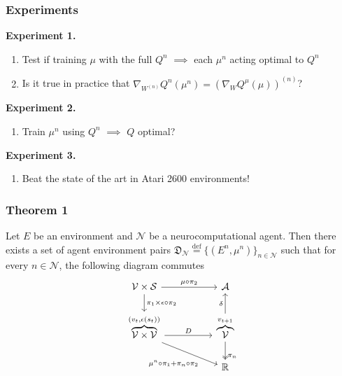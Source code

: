 \documentclass{beamer}
\numberwithin{equation}{subsection}
\numberwithin{theorem}{subsection}
\def\reals{{\mathbb R}}
\def\defeq{\stackrel{\text{def}}{=}}
\def\scriptv{{\mathcal V}}
\def\scripta{{\mathcal A}}
\def\scriptn{{\mathcal N}}
\def\scripts{{\mathcal S}}
\begin{document}
\begin{frame}
  \frametitle{Experiments}
  \textbf{Experiment 1.}
  \begin{enumerate}
    \item Test if training $\mu$ with the full $Q^n$ $\implies$ each $\mu^n$ acting optimal to $Q^n$
    \item Is it true in practice that $\nabla_{W^{(n)}} Q^{n}(\mu^n) = \left(\nabla_{W} Q^\mu(\mu)\right)^{(n)}$?
  \end{enumerate}
    \textbf{Experiment 2.}
    \begin{enumerate}
      \item Train $\mu^n$ using $Q^n$ $\implies$ $Q$ optimal?
    \end{enumerate}
        \textbf{Experiment 3.}
    \begin{enumerate}
      \item Beat the state of the art in Atari 2600 environments!
    \end{enumerate}
\end{frame}
\begin{frame}
    \frametitle{Theorem 1}
    \begin{theorem}\label{thm:ncomp}
      Let $E$ be an environment and $\scriptn$ be a neurocomputational agent. Then there exists a set of agent environment pairs $\mathfrak{D}_\scriptn \defeq \{(E^n, \mu^n)\}_{n\in \scriptn}$ such that for every $n \in \scriptn$, the following diagram commutes
        \begin{equation}\label{eq:sub_env_com}
            \begin{tikzcd} %
          \scriptv  \times \scripts \arrow{r}{\mu\circ\pi_2}
               \arrow{d}
                 {\pi_1  \times\epsilon \circ \pi_2}  &[+25pt]  \scripta    \\
            \overbrace{\scriptv \times \scriptv}^{(v_{t},\epsilon(s_t))}
                        \arrow{r}{D}
                                    \arrow[pos = 0.7]{rd}[swap]{\mu^n\circ\pi_1 + \pi_n \circ \pi_2}
                        & \overbrace{\scriptv}^{v_{t+1}}
                                              \arrow[two heads, pos=0.8]
                                                {d}
                                                {\pi_n}
                                              \arrow{u}{\delta} \\
    &\reals
           \end{tikzcd}
        \end{equation}
    \end{theorem}
\end{frame}
\end{document}
